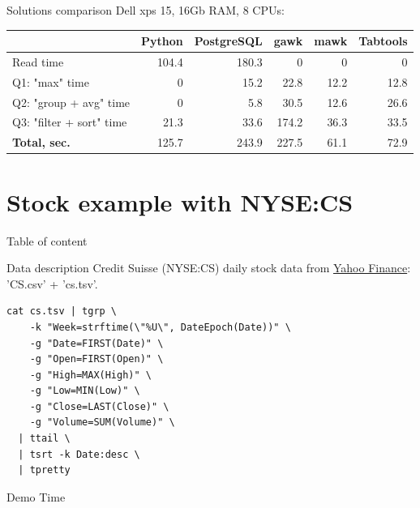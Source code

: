\documentclass[unicode, notheorems, aspectratio=169]{beamer}
\begin{document}
\begin{frame}{Solutions comparison}
Dell xps 15, 16Gb RAM, 8 CPUs:
\vfill
\begin{tabular}{ |l|r|r|r|r|r| } 
  \hline
  & \textbf{Python} & \textbf{PostgreSQL} & \textbf{gawk} & \textbf{mawk} & \textbf{Tabtools} \\ \hline
  Read time & 104.4 & 180.3 & 0 & 0 & 0 \\ \hline
  Q1: "max" time & 0 & 15.2 & 22.8 & 12.2 & 12.8 \\ \hline
  Q2: "group + avg" time & 0 & 5.8 & 30.5 & 12.6 & 26.6\footnotemark \\ \hline
  Q3: "filter + sort" time & 21.3 & 33.6 & 174.2 & 36.3 & 33.5 \\ \hline
  \textbf{Total, sec.} & 125.7 & 243.9 & 227.5 & \alert{61.1} & \alert{72.9} \\ \hline
\end{tabular}
\end{frame}

\section{Stock example with NYSE:CS}
\begin{frame}{Table of content}
	\tableofcontents[currentsection]
\end{frame}

\begin{frame}[fragile]{Data description}
Credit Suisse (NYSE:CS) daily stock data from \href{https://finance.yahoo.com/quote/CS/history?period1=800553600&period2=1508515200&interval=1d&filter=history&frequency=1d}{Yahoo Finance}: 'CS.csv' + 'cs.tsv'.
\vfill
\begin{verbatim}
cat cs.tsv | tgrp \
    -k "Week=strftime(\"%U\", DateEpoch(Date))" \
    -g "Date=FIRST(Date)" \
    -g "Open=FIRST(Open)" \
    -g "High=MAX(High)" \
    -g "Low=MIN(Low)" \
    -g "Close=LAST(Close)" \
    -g "Volume=SUM(Volume)" \
  | ttail \
  | tsrt -k Date:desc \
  | tpretty
\end{verbatim}
\end{frame}

\begin{frame}[noframenumbering]
	\begin{center}
		{\huge Demo Time}
	\end{center}
\end{frame}
\end{document}
